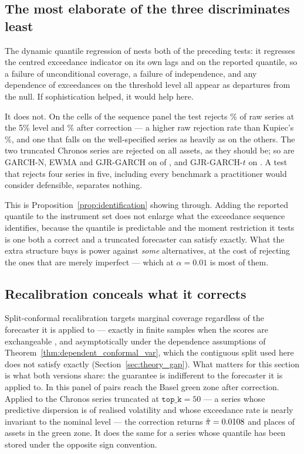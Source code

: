 \documentclass[preprint,11pt,authoryear]{elsarticle}
\newcommand{\1}{\boldsymbol{1}}
\begin{document}
\subsection{The most elaborate of the three discriminates least}
\label{sec:blindspot_dq}

The dynamic quantile regression of \citet{engle2004caviar} nests both of the
preceding tests: it regresses the centred exceedance indicator on its own lags
and on the reported quantile, so a failure of unconditional coverage, a failure
of independence, and any dependence of exceedances on the threshold level all
appear as departures from the null. If sophistication helped, it would help here.

It does not. On the \nSeqDQCells{} cells of the sequence panel the test rejects
\nSeqDQRejRaw\% of raw series at the 5\% level and \nSeqDQRejCor\% after
correction --- a higher raw rejection rate than Kupiec's
\nSeqKupiecRejRawOne\%, and one that falls on the well-specified series as
heavily as on the others. The two truncated Chronos series are rejected on all
\nMainAssets{} assets, as they should be; so are GARCH-N, EWMA and GJR-GARCH on
\nMainDQRejBenchmark{} of \nMainAssets{}, and GJR-GARCH-$t$ on
\nMainDQRejGjrT. A test that rejects four series in
five, including every benchmark a practitioner would consider defensible,
separates nothing.

This is Proposition~\ref{prop:identification} showing through. Adding the
reported quantile to the instrument set does not enlarge what the exceedance
sequence identifies, because the quantile is predictable and the moment
restriction it tests is one both a correct and a truncated forecaster can satisfy
exactly. What the extra structure buys is power against \emph{some} alternatives,
at the cost of rejecting the ones that are merely imperfect --- which at
$\alpha = 0.01$ is most of them.

\subsection{Recalibration conceals what it corrects}
\label{sec:blindspot_conformal}

Split-conformal recalibration targets marginal coverage regardless of the
forecaster it is applied to --- exactly in finite samples when the scores are
exchangeable \citep{vovk2005algorithmic,lei2018distribution}, and asymptotically
under the dependence assumptions of Theorem~\ref{thm:dependent_conformal_var},
which the contiguous split used here does not satisfy exactly
(Section~\ref{sec:theory_gap}). What matters for this section is what both
versions share: the guarantee is indifferent to the forecaster it is applied to.
In this panel \nMainGreen{} of \nMainPairs{} pairs reach the Basel green zone
after correction. Applied to the Chronos series truncated at
$\texttt{top\_k} = 50$ --- a series whose predictive dispersion is
\nDispDefaultSmall{} of realised volatility and whose exceedance rate is nearly
invariant to the nominal level --- the correction returns $\hat\pi =
0.0108$ and places \nTruncCorGreen{} of \nMainAssets{} assets in the green
zone. It does the same for a series whose quantile has been stored under the
opposite sign convention.
\end{document}
